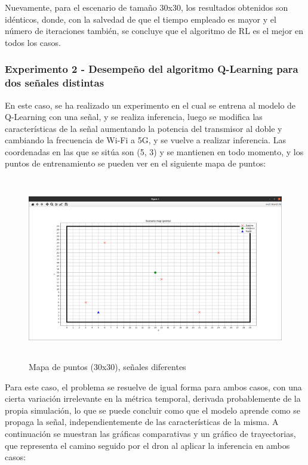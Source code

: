 Nuevamente, para el escenario de tamaño 30x30, los resultados obtenidos son idénticos, donde, con la salvedad de que el tiempo empleado es mayor y el número de iteraciones también, se concluye que el algoritmo de \ac{RL} es el mejor en todos los casos.\\

\subsubsection{Experimento 2 - Desempeño del algoritmo Q-Learning para dos señales distintas}
\label{subsubsec:experimentos_1}

En este caso, se ha realizado un experimento en el cual se entrena al modelo de Q-Learning con una señal, y se realiza inferencia, luego se modifica las características de la señal aumentando la potencia del transmisor al doble y cambiando la frecuencia de Wi-Fi a 5G, y se vuelve a realizar inferencia. Las coordenadas en las que se sitúa son (5, 3) y se mantienen en todo momento, y los puntos de entrenamiento se pueden ver en el siguiente mapa de puntos:\\

\begin{figure} [H]
    \begin{center}
    \includegraphics[height=8cm]{imagenes/cap4/25_mapa_p_diff.png}
    \end{center}
    \caption[Mapa de puntos (30x30), señales diferentes]{Mapa de puntos (30x30), señales diferentes}
    \label{fig:map_p_diff_30}
\end{figure}

Para este caso, el problema se resuelve de igual forma para ambos casos, con una cierta variación irrelevante en la métrica temporal, derivada probablemente de la propia simulación, lo que se puede concluir como que el modelo aprende como se propaga la señal, independientemente de las características de la misma. A continuación se muestran las gráficas comparativas y un gráfico de trayectorias, que representa el camino seguido por el dron al aplicar la inferencia en ambos casos:\\

